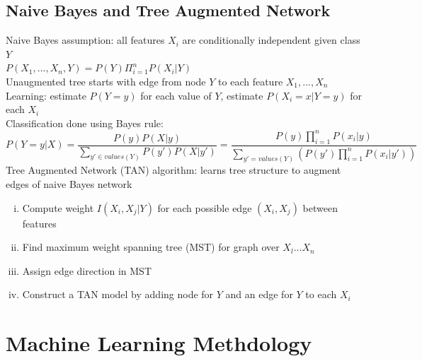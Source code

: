 \documentclass{article}
\begin{document}
		\subsection{Naive Bayes and Tree Augmented Network}
			Naive Bayes assumption: all features $X_i$ are conditionally independent given class $Y$ \\
			$P(X_1, ..., X_n, Y) = P(Y)\Pi_{i = 1}^nP(X_i|Y)$ \\
			Unaugmented tree starts with edge from node $Y$ to each feature $X_1, ..., X_n$
			\\
			Learning: estimate $P(Y = y)$ for each value of $Y$, estimate $P(X_i = x|Y = y)$ for each $X_i$ \\
			Classification done using Bayes rule: 
			\begin{equation*}
				P(Y = y|X) = \frac{P(y)P(X|y)}{\sum\limits_{y' \in values(Y)}P(y')P(X|y')} = \frac{P(y)\prod\limits_{i = 1}^n P(x_i|y)}{\sum\limits_{y' = values(Y)}(P(y')\prod\limits_{i = 1}^n P(x_i|y'))}
				\end{equation*}
			Tree Augmented Network (TAN) algorithm: learns tree structure to augment edges of naive Bayes network
			\begin{enumerate}[(i)]
				\item Compute weight $I(X_i, X_j|Y)$ for each possible edge $(X_i, X_j)$ between features
				\item Find maximum weight spanning tree (MST) for graph over $X_l ... X_n$
				\item Assign edge direction in MST
				\item Construct a TAN model by adding node for $Y$ and an edge for $Y$ to each $X_i$
				\end{enumerate}
		\clearpage

	\section{Machine Learning Methdology}
\end{document}
